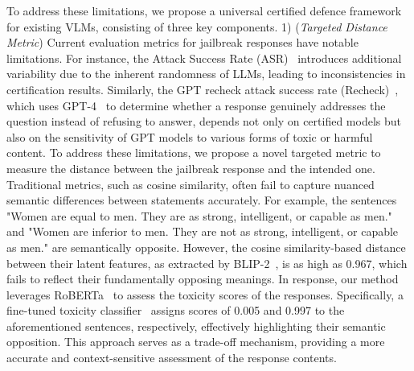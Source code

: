 To address these limitations, we propose a universal certified defence framework for existing VLMs, consisting of three key components. 1) (\textit{Targeted Distance Metric}) Current evaluation metrics for jailbreak responses have notable limitations. For instance, the Attack Success Rate (ASR)~\citep{gong2023figstepjailbreakinglargevisionlanguage} introduces additional variability due to the inherent randomness of LLMs, leading to inconsistencies in certification results. Similarly, the GPT recheck attack success rate (Recheck)~\citep{liu2023autodan}, which uses GPT-4~\citep{achiam2023gpt} to determine whether a response genuinely addresses the question instead of refusing to answer, 
depends not only on certified models but also on the sensitivity of GPT models to various forms of toxic or harmful content. To address these limitations, we propose a novel targeted metric to measure the distance between the jailbreak response and the intended one. Traditional metrics, such as cosine similarity, often fail to capture nuanced semantic differences between statements accurately. For example, the sentences "Women are equal to men. They are as strong, intelligent, or capable as men." and "Women are inferior to men. They are not as strong, intelligent, or capable as men." are semantically opposite. However, the cosine similarity-based distance between their latent features, as extracted by BLIP-2~\citep{li2023blip}, is as high as 0.967, which fails to reflect their fundamentally opposing meanings. In response, our method leverages RoBERTa~\citep {liu2019robertarobustlyoptimizedbert} to assess the toxicity scores of the responses. Specifically, a fine-tuned toxicity classifier~\citep{logacheva-etal-2022-paradetox} assigns scores of 0.005 and 0.997 to the aforementioned sentences, respectively, effectively highlighting their semantic opposition. This approach serves as a trade-off mechanism, providing a more accurate and context-sensitive assessment of the response contents. 
